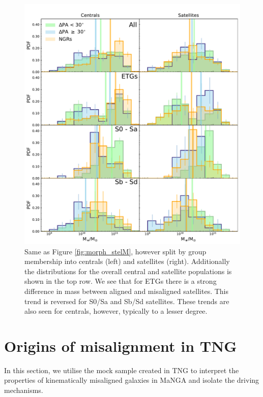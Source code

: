 \documentclass[fleqn,usenatbib]{mnras}
\begin{document}
\begin{figure}
	\includegraphics[width=\linewidth]{cen_sat/delPA_stelM_morph_lim.pdf}
    \caption{Same as Figure \ref{fig:morph_stelM}, however split by group membership into centrals (left) and satellites (right). Additionally the distributions for the overall central and satellite populations is shown in the top row. We see that for ETGs there is a strong difference in mass between aligned and misaligned satellites. This trend is reversed for S0/Sa and Sb/Sd satellites. These trends are also seen for centrals, however, typically to a lesser degree.}
    \label{fig:group_morph_stelM}
\end{figure}

\section{Origins of misalignment in TNG}
In this section, we utilise the mock sample created in TNG to interpret the properties of kinematically misaligned galaxies in MaNGA and isolate the driving mechanisms. 
\end{document}
